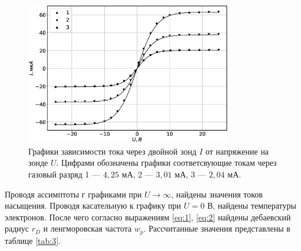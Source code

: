 \documentclass[12pt]{article}
\begin{document}
\begin{figure}[H]
	\centering
	\includegraphics[width=0.8\textwidth]{UI_main.eps}
	\caption{Графики зависимости тока через двойной зонд $I$ от напряжение на зонде $U$. 
    Цифрами обозначены графики соответсвующие токам через газовый разряд 1 --- $4,25$ мА, 
    2 --- $3,01$ мА, 3 --- $2,04$ мА.}
	\label{fig:UI}
\end{figure}

Проводя ассимптоты г графиками при $U \to \infty$, найдены значения токов насыщения. 
Проводя касательную к графику при $U = 0$ В, найдены температуры электронов. После чего согласно 
выражениям \ref{eq:1}, \ref{eq:2} найдены дебаевский радиус $r_D$ и ленгморовская частота $w_p$.
Рассчитанные значения представлены в таблице \ref{tab:3}. 
\end{document}
